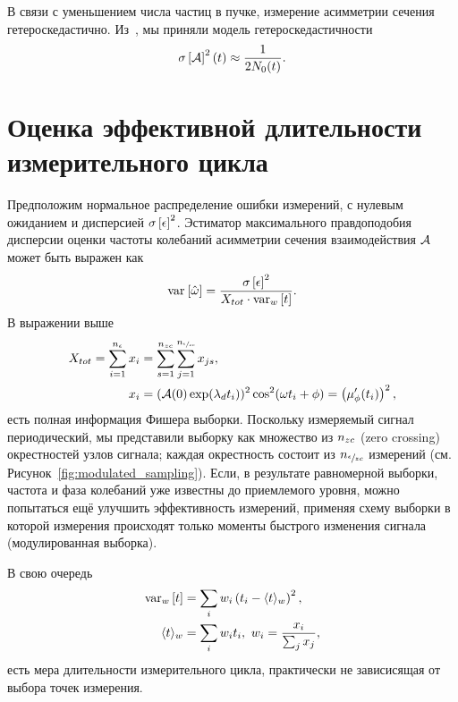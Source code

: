 В связи с уменьшением числа частиц в пучке, измерение асимметрии
сечения гетероскедастично. Из~\cite[стр.~18]{Eversmann:Thesis}, мы приняли
модель гетероскедастичности
\begin{equation}\label{eq:AsymHtsk}
\SD{\Asym}^2(t) \approx \frac{1}{2N_0(t)}.
\end{equation}

\section{Оценка эффективной длительности измерительного цикла}

\newcommand{\dtnd}{\dt_{zc}}
\newcommand{\SNR}{\text{SNR}}

Предположим нормальное распределение ошибки измерений, с нулевым
ожиданием и дисперсией $\SD{\meas}^2$. Эстиматор максимального
правдоподобия дисперсии оценки частоты колебаний асимметрии сечения
взаимодействия $\mathcal{A}$ может быть выражен как
\begin{equation}\label{eq:VarW}
	\var{\hat\w} = \frac{\SD{\meas}^2}{X_{tot}\cdot \var[w]{t}}.
\end{equation}
В выражении выше
\begin{align*}
X_{tot} = \sum_{i=1}^{\Nm} x_i &= \sum_{s=1}^{\Nnd}\sum_{j=1}^{\Nmnd} x_{js},\\
x_i &= (\Asym(0)\exp(\lamd t_i))^2\cos^2(\w t_i + \phi) = \bkt{\mupp}^2,
\end{align*}
есть полная информация Фишера выборки. Поскольку измеряемый сигнал периодический, мы представили 
выборку как множество из  ${n_{zc}}$ (zero crossing) окрестностей узлов сигнала; каждая окрестность состоит
из ${n_{\sfrac{\epsilon}{zc}}}$ измерений (см. Рисунок~\ref{fig:modulated_sampling}). 
Если, в результате равномерной выборки, частота и фаза колебаний уже известны до приемлемого уровня, 
можно попытаться ещё улучшить эффективность измерений, применяя схему выборки 
в которой измерения происходят только моменты быстрого изменения сигнала (модулированная выборка).

В свою очередь
\begin{align*}
	\var[w]{t} &= \sum_i w_i \bkt{t_i - \avg{t}[w]}^2,\\
	 \avg{t}[w] &= \sum_i w_i t_i, ~w_i = \frac{x_i}{\sum_j x_j},
\end{align*}
есть мера длительности измерительного цикла, практически не зависисящая от выбора точек измерения.

